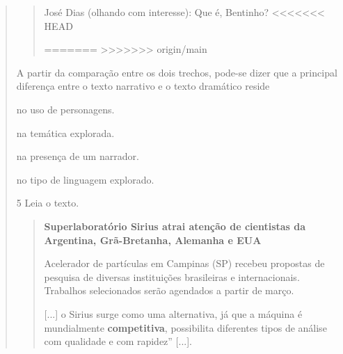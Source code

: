 \begin{quote}
\begin{quote}
José Dias (olhando com interesse): Que é, Bentinho?
<<<<<<< HEAD

=======
>>>>>>> origin/main
\end{quote}

A partir da comparação entre os dois trechos, pode-se dizer que a
principal diferença entre o texto narrativo e o texto dramático reside

\begin{escolha}
\item no uso de personagens.

\item na temática explorada.

\item na presença de um narrador.

\item no tipo de linguagem explorado.
\end{escolha}


\num{5} Leia o texto.

\begin{quote}
\textbf{Superlaboratório Sirius atrai atenção de cientistas da
Argentina, Grã-Bretanha, Alemanha e EUA}

Acelerador de partículas em Campinas (SP) recebeu propostas de
pesquisa de diversas instituições brasileiras e internacionais.
Trabalhos selecionados serão agendados a partir de março.

{[}...{]} o Sirius surge como uma alternativa, já que a máquina é
mundialmente \textbf{competitiva}, possibilita diferentes tipos de
análise com qualidade e com rapidez” {[}...{]}.


\end{quote}
\end{quote}
